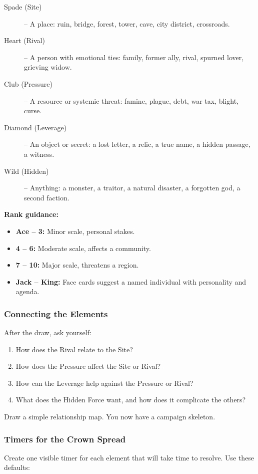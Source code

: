\begin{tcolorbox}[colback=gray!5!white, colframe=black, title=Quick Interpretation Guide,breakable]
\begin{description}
\item[Spade (Site)] -- A place: ruin, bridge, forest, tower, cave, city district, crossroads.
\item[Heart (Rival)] -- A person with emotional ties: family, former ally, rival, spurned lover, grieving widow.
\item[Club (Pressure)] -- A resource or systemic threat: famine, plague, debt, war tax, blight, curse.
\item[Diamond (Leverage)] -- An object or secret: a lost letter, a relic, a true name, a hidden passage, a witness.
\item[Wild (Hidden)] -- Anything: a monster, a traitor, a natural disaster, a forgotten god, a second faction.
\end{description}

\medskip
\noindent \textbf{Rank guidance:}
\begin{itemize}
  \item \textbf{Ace -- 3:} Minor scale, personal stakes.
  \item \textbf{4 -- 6:} Moderate scale, affects a community.
  \item \textbf{7 -- 10:} Major scale, threatens a region.
  \item \textbf{Jack -- King:} Face cards suggest a named individual with personality and agenda.
\end{itemize}
\end{tcolorbox}

\subsubsection{Connecting the Elements}
After the draw, ask yourself:
\begin{enumerate}
  \item How does the Rival relate to the Site?
  \item How does the Pressure affect the Site or Rival?
  \item How can the Leverage help against the Pressure or Rival?
  \item What does the Hidden Force want, and how does it complicate the others?
\end{enumerate}
Draw a simple relationship map. You now have a campaign skeleton.

\subsubsection{Timers for the Crown Spread}
Create one visible timer for each element that will take time to resolve. Use these defaults:

